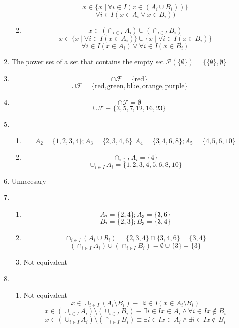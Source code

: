 \begin{enumerate}
\begin{enumerate}
        \[x \in \{x \mid \forall i \in I (x \in (A_i \cup B_i))\}\]
        \[\forall i \in I (x \in A_i \lor x \in B_i))\]
        \item 
        \[x \in (\cap_{i \in I} A_i) \cup (\cap_{i \in I} B_i)\]
        \[x \in \{x \mid \forall i \in I (x \in A_i)\} \cup \{x \mid \forall i \in I (x \in B_i)\}\]
        \[\forall i \in I (x \in A_i) \lor \forall i \in I (x \in B_i)\]
    \end{enumerate}
    \item
    The power set of a set that contains the empty set $\mathscr{P}(\{\emptyset\})=\{\{\emptyset\},\emptyset \}$
    \item 
    \[\cap \mathscr{F} = \{\text{red}\}\]
    \[\cup \mathscr{F} = \{\text{red},\text{green},\text{blue},\text{orange},\text{purple}\}\]
    \item 
    \[\cap \mathscr{F} = \emptyset\]
    \[\cup \mathscr{F} = \{3,5,7,12,16,23\}\]
    \item 
    \begin{enumerate}
        \item \[A_2=\{1,2,3,4\}; A_3=\{2,3,4,6\}; A_4=\{3,4,6,8\}; A_5=\{4,5,6,10\}\]
        \item 
        \[\cap_{i \in I} A_i = \{4\}\]
        \[\cup_{i \in I} A_i = \{1,2,3,4,5,6,8,10\}\]
    \end{enumerate}
    \item Unnecesary
    \item
    \begin{enumerate}
        \item 
        \[A_2 = \{2,4\}; A_3 = \{3,6\}\]
        \[B_2 = \{2,3\}; B_3 = \{3,4\}\]
        \item 
        \[\cap_{i \in I} (A_i \cup B_i) = \{2,3,4\} \cap \{3,4,6\} = \{3,4\} \]
        \[(\cap_{i \in I} A_i) \cup (\cap_{i \in I} B_i) = \emptyset \cup \{3\} = \{3\}\]
        \item 
        Not equivalent
    \end{enumerate}
    \item
    \begin{enumerate}
        \item Not equivalent
        \[x \in \cup_{i \in I} (A_i \setminus B_i) \equiv \exists i \in I (x \in A_i \setminus B_i)\]
        \[x \in (\cup_{i \in I} A_i) \setminus (\cup_{i \in I} B_i) \equiv \exists i \in I x \in A_i \land \forall i \in I x \notin B_i\]
        \[x \in (\cup_{i \in I} A_i) \setminus (\cap_{i \in I} B_i) \equiv \exists i \in I x \in A_i \land \exists i \in I x \notin B_i\]

\end{enumerate}
\end{enumerate}
